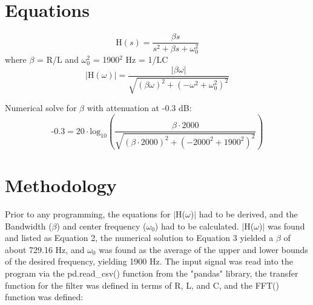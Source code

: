 \documentclass[12pt]{report}
\begin{document}
\section{Equations}
\begin{equation}
    \text{H}(s) = \frac{\beta s}{s^{2}+\beta s+\omega _{0}^{2}}
\end{equation}
where $\beta$ = R/L and $\omega _{0}^{2}$ = 1900$^{2}$ Hz = 1/LC
\begin{equation}
    |\text{H}(\omega)| = \frac{|\beta \omega|}{\sqrt{(\beta \omega)^{2} + (-\omega ^{2}+\omega _{0}^{2})^{2}}}
\end{equation}

Numerical solve for $\beta$ with attenuation at -0.3 dB:
\begin{equation}
    \text{-}0.3 = 20\cdot \text{log}_{10} \left( \frac{\beta \cdot 2000}{\sqrt{(\beta \cdot 2000)^{2} + (-2000^{2}+1900^{2})^{2}}} \right)
\end{equation}

\pagebreak

\section{Methodology}
Prior to any programming, the equations for $|$H($\omega$)$|$ had to be derived, and the Bandwidth ($\beta$) and center frequency ($\omega_{0}$) had to be calculated. $|$H($\omega$)$|$ was found and listed as Equation 2, the numerical solution to Equation 3 yielded a $\beta$ of about 729.16 Hz, and $\omega_{0}$ was found as the average of the upper and lower bounds of the desired frequency, yielding 1900 Hz. The input signal was read into the program via the pd.read\_csv() function from the "pandas" library, the transfer function for the filter was defined in terms of R, L, and C, and the FFT() function was defined:\\
\end{document}
